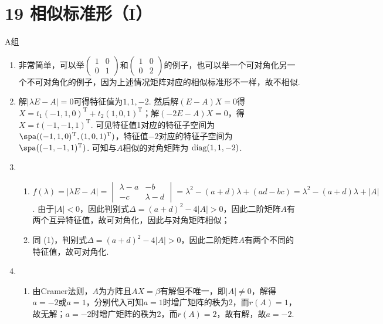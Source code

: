 \section*{19 相似标准形（I）}

\vspace{2ex}

\centerline{\heiti A组}
\begin{enumerate}
    \item 非常简单，可以举$\begin{pmatrix}
                  1 & 0 \\ 0 & 1
              \end{pmatrix}$和$\begin{pmatrix}
                  1 & 0 \\ 0 & 2
              \end{pmatrix}$的例子，也可以举一个可对角化另一个不可对角化的例子，因为上述情况矩阵对应的相似标准形不一样，故不相似.

    \item 解$|\lambda E-A|=0$可得特征值为$1,1,-2$. 然后解$(E-A)X=0$得$X=t_1(-1,1,0)^\mathrm{T}+t_2(1,0,1)^\mathrm{T}$；解$(-2E-A)X=0$，得$X=t(-1,-1,1)^\mathrm{T}$. 可见特征值1对应的特征子空间为$\spa((-1,1,0)^\mathrm{T},(1,0,1)^\mathrm{T})$，特征值$-2$对应的特征子空间为 $\spa((-1,-1,1)^\mathrm{T})$. 可知与$A$相似的对角矩阵为 $\operatorname{diag}(1,1,-2)$.

    \item \begin{enumerate}
              \item $f(\lambda)=|\lambda E-A|=\begin{vmatrix}
                            \lambda-a & -b \\ -c & \lambda-d
                        \end{vmatrix}=\lambda^2-(a+d)\lambda+(ad-bc)=\lambda^2-(a+d)\lambda+|A|$. 由于$|A|<0$，因此判别式$\Delta=(a+d)^2-4|A|>0$，因此二阶矩阵$A$有两个互异特征值，故可对角化，因此与对角矩阵相似；

              \item 同 (1)，判别式$\Delta=(a+d)^2-4|A|>0$，因此二阶矩阵$A$有两个不同的特征值，故可对角化.
          \end{enumerate}

    \item \begin{enumerate}
              \item 由Cramer法则，$A$为方阵且$AX=\beta$有解但不唯一，即$|A|\neq 0$，解得$a=-2$或$a=1$，分别代入可知$a=1$时增广矩阵的秩为2，而$r(A)=1$，故无解；$a=-2$时增广矩阵的秩为2，而$r(A)=2$，故有解，故$a=-2$.


\end{enumerate}
\end{enumerate}

